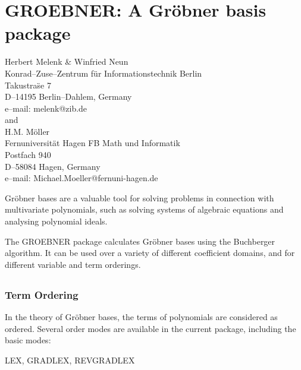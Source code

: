 \documentclass[11pt,letterpaper]{book}
\makeatletter
\newcommand{\underscore}{\_}
\newcommand{\ttindex}[1]{{\renewcommand{\_}{\protect\underscore}%
                          \index{#1@{\tt #1}}}}
\makeatother
\begin{document}
\chapter{GROEBNER: A Gr\"obner basis package}
\label{GROEBNER}

{\footnotesize
\begin{center}
Herbert Melenk \& Winfried Neun \\
Konrad--Zuse--Zentrum f\"ur Informationstechnik Berlin \\
Takustra\"se 7 \\
D--14195 Berlin--Dahlem, Germany \\[0.05in]
e--mail:  melenk@zib.de \\[0.05in]
and \\[0.05in]
H.M. M\"oller \\
Fernuniversit\"at Hagen FB Math und Informatik\\
Postfach 940 \\
D--58084 Hagen, Germany\\[0.05in]
e--mail: Michael.Moeller@fernuni-hagen.de
\end{center}
}

\ttindex{GROEBNER}

Gr\"obner bases are a valuable tool for solving problems in
connection with multivariate polynomials, such as solving systems of
algebraic equations and analysing polynomial ideals.

The GROEBNER package calculates Gr\"obner bases using the
Buchberger algorithm.  It can be used over a variety of different
coefficient domains, and for different variable and term orderings.

\section{}
\subsection{Term Ordering} \par
In the theory of Gr\"obner bases, the terms of polynomials are
considered as ordered.  Several order modes are available in
the current package, including the basic modes:

\begin{center}
LEX, GRADLEX, REVGRADLEX
\end{center}
\end{document}

